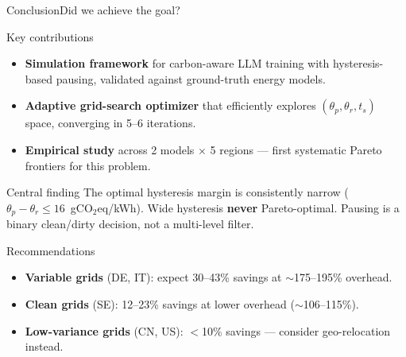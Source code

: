 \begin{frame}[t]{Conclusion}{Did we achieve the goal?}

  \begin{block}{Key contributions}
    \begin{itemize}
      \item \textbf{Simulation framework} for carbon-aware LLM training with
        hysteresis-based pausing, validated against ground-truth energy models.
      \item \textbf{Adaptive grid-search optimizer} that efficiently explores
        $(\theta_p, \theta_r, t_s)$ space, converging in 5--6 iterations.
      \item \textbf{Empirical study} across 2 models $\times$ 5 regions
        --- first systematic Pareto frontiers for this problem.
    \end{itemize}
  \end{block}

  \vspace{0.2cm}
  \begin{alertblock}{Central finding}
    The optimal hysteresis margin is consistently narrow
    ($\theta_p - \theta_r \leq 16$~gCO$_2$eq/kWh).
    Wide hysteresis \textbf{never} Pareto-optimal.
    Pausing is a binary clean/dirty decision, not a multi-level filter.
  \end{alertblock}

  \vspace{0.2cm}
  \begin{block}{Recommendations}
    \begin{itemize}
      \item \textbf{Variable grids} (DE, IT): expect 30--43\% savings at $\sim$175--195\% overhead.
      \item \textbf{Clean grids} (SE): 12--23\% savings at lower overhead ($\sim$106--115\%).
      \item \textbf{Low-variance grids} (CN, US): $<$10\% savings --- consider geo-relocation instead.
    \end{itemize}
  \end{block}

\end{frame}
